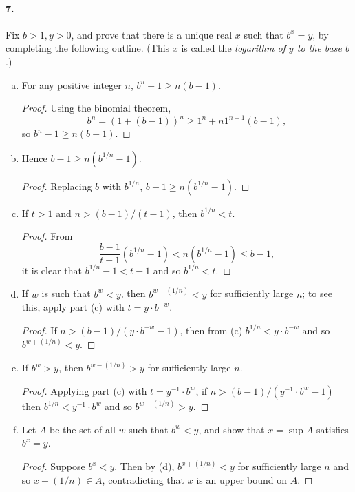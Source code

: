 \documentclass{article}
\begin{document}
\paragraph{7.} Fix $b > 1, y > 0$, and prove that there is a unique real $x$
such that $b^x = y$, by completing the following outline. (This $x$ is called
the \emph{logarithm of $y$ to the base $b$}.)
\begin{enumerate}[(a)]
  \item For any positive integer $n$, $b^n - 1 \geq n(b - 1)$.
    \begin{proof}
      Using the binomial theorem, \[
        b^n = (1 + (b - 1))^n \geq 1^n + n1^{n-1}(b - 1),
      \] so $b^n - 1 \geq n(b - 1)$.
    \end{proof}

  \item Hence $b - 1 \geq n(b^{1/n} - 1)$.
    \begin{proof}
      Replacing $b$ with $b^{1/n}$, $b - 1 \geq n(b^{1/n} - 1)$.
    \end{proof}

  \item If $t > 1$ and $n > (b - 1)/(t - 1)$, then $b^{1/n} < t$.
    \begin{proof}
      From \[
        \frac{b - 1}{t - 1}(b^{1/n} - 1) < n(b^{1/n} - 1) \leq b - 1,
      \] it is clear that $b^{1/n} - 1 < t - 1$ and so $b^{1/n} < t$.
    \end{proof}

  \item If $w$ is such that $b^w < y$, then $b^{w+(1/n)} < y$ for sufficiently
    large $n$; to see this, apply part (c) with $t = y \cdot b^{-w}$.
    \begin{proof}
      If $n > (b - 1)/(y \cdot b^{-w} - 1)$, then from (c) $b^{1/n} < y \cdot
      b^{-w}$ and so $b^{w+(1/n)} < y$.
    \end{proof}

  \item If $b^w > y$, then $b^{w-(1/n)} > y$ for sufficiently large $n$.
    \begin{proof}
      Applying part (c) with $t = y^{-1} \cdot b^{w}$, if $n > (b - 1)/(y^{-1}
      \cdot b^{w} - 1)$ then $b^{1/n} < y^{-1} \cdot b^{w}$ and so $b^{w-(1/n)}
      > y$.
    \end{proof}

  \item Let $A$ be the set of all $w$ such that $b^w < y$, and show that $x =
    \sup A$ satisfies $b^x = y$.
    \begin{proof}
      Suppose $b^x < y$. Then by (d), $b^{x+(1/n)} < y$ for sufficiently large
      $n$ and so $x + (1/n) \in A$, contradicting that $x$ is an upper bound on
      $A$.


\end{proof}
\end{enumerate}
\end{document}
